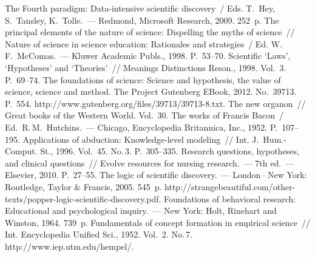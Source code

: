



 \begin{multicols}{2}

\renewcommand{\bibname}{\protect\rmfamily Литература}

{\small\frenchspacing
{%
\begin{thebibliography}{99}
The Fourth paradigm: Data-intensive scientific discovery~/
Eds. T.~Hey, S.~Tansley, K.~Tolle.~--- Redmond, Microsoft Research, 2009.  252~p.
 The principal elements of the nature of science: Dispelling the
myths of science~// Nature of science in science education: Rationales and
strategies~/ Ed. W.\,F.~McComas.~--- Kluwer Academic Publs., 1998. P.~53--70.
 Scientific `Laws', `Hypotheses' and `Theories'~//
Meanings Distinctions Reson., 1998. Vol.~3. P.~69--74.
 The foundations of science: Science and
hypothesis, the value of science,  science and method. The Project Gutenberg
EBook, 2012. No.~39713. P.~554.
{\sf http://www.gutenberg.org/files/39713/39713-8.txt}.
 The new organon~// Great books of the Western World. Vol.~30. The works of
Francis Bacon~/ Ed.\ R.\,M.~Hutchins.~--- Chicago, Encyclopedia Britannica, Inc.,
1952.  P.~107--195.
 Applications of abduction: Knowledge-level modeling~//
Int. J.~Hum.-Comput. St., 1996. Vol.~45. No.\,3. P.~305--335.
 Research questions, hypotheses, and clinical questions~// Evolve
resources for nursing research.~--- 7th ed.~--- Elsevier, 2010. P.~27--55.
 The logic of scientific discovery.~---
London\,--\,New York: Routledge, Taylor \& Francis,
2005. 545~p. {\sf http://strangebeautiful.com/other-texts/popper-logic-scientific-discovery.pdf}.
 Foundations of behavioral research: Educational
and psychological inquiry.~--- New York: Holt, Rinehart and Winston, 1964. 739~p.
 Fundamentals of concept formation in empirical science~// Int.
Encyclopedia Unified Sci., 1952. Vol.~2. No.\,7.
{\sf
http://www.iep.utm.edu/hempel/}.



\end{thebibliography}}}
\end{multicols}
